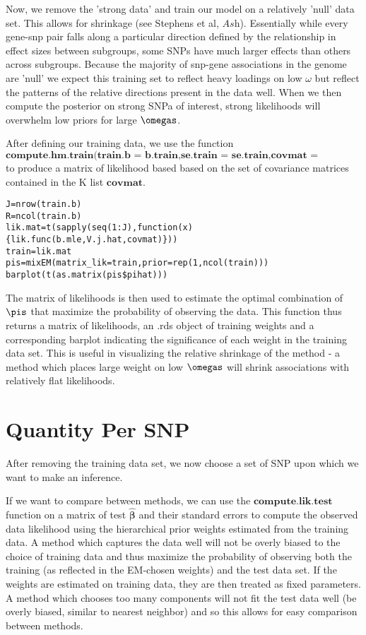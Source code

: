 \documentclass[10pt]{article}
\begin{document}
Now, we remove the 'strong data' and train our model on a relatively 'null' data set. This allows for shrinkage (see Stephens et al, $\textit{Ash}$). Essentially while every gene-snp pair falls along a particular direction defined by the relationship in effect sizes between subgroups, some SNPs have much larger effects than others across subgroups. Because the majority of snp-gene associations in the genome are 'null' we expect this training set to reflect heavy loadings on low $\omega$ but reflect the patterns of the relative directions present in the data well. When we then compute the posterior on strong SNPa of interest, strong likelihoods will overwhelm low priors for large $\omegas$.


After defining our training data, we use the function $\textbf{compute.hm.train(train.b = b.train,se.train = se.train,covmat = covmat,A="Simulations")}$ to produce a matrix  of likelihood based based on the set of covariance matrices contained in the K list $\textbf{covmat}$. 

\begin{verbatim}
J=nrow(train.b)
R=ncol(train.b)
lik.mat=t(sapply(seq(1:J),function(x){lik.func(b.mle,V.j.hat,covmat)}))
train=lik.mat
pis=mixEM(matrix_lik=train,prior=rep(1,ncol(train)))
barplot(t(as.matrix(pis$pihat)))
\end{verbatim}

The matrix of likelihoods is then used to estimate the optimal combination of $\pis$ that maximize the probability of observing the data. This function thus returns a matrix of likelihoods, an .rds object of training weights and a corresponding barplot indicating the significance of each weight in the training data set. This is useful in visualizing the relative shrinkage of the method - a method which places large weight on low $\omegas$ will shrink associations with relatively flat likelihoods.


\section{Quantity Per SNP}

After removing the training data set, we now choose a set of SNP upon which we want to make an inference. 

If we want to compare between methods, we can use the $\textbf{compute.lik.test}$ function on a matrix of test $\hat{\bm{\beta}}$ and their standard errors to compute the observed data likelihood using the hierarchical prior weights estimated from the training data. A method which captures the data well will not be overly biased to the choice of training data and thus maximize the probability of observing both the training (as reflected in the EM-chosen weights) and the test data set. If the weights are estimated on training data, they are then treated as fixed parameters. A method which chooses too many components will not fit the test data well (be overly biased, similar to nearest neighbor) and so this allows for easy comparison between methods.
\end{document}
